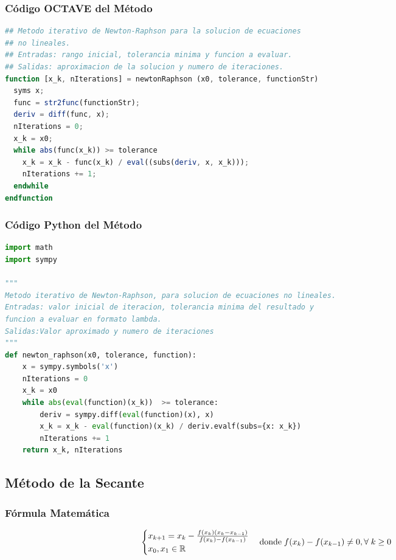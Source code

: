 \documentclass[12pt]{article}
\begin{document}
\subsubsection{Código OCTAVE del Método}
\begin{lstlisting}[language=OCTAVE, caption=Implementación del método de bisección en Octave]
## Metodo iterativo de Newton-Raphson para la solucion de ecuaciones
## no lineales.
## Entradas: rango inicial, tolerancia minima y funcion a evaluar.
## Salidas: aproximacion de la solucion y numero de iteraciones.
function [x_k, nIterations] = newtonRaphson (x0, tolerance, functionStr)
  syms x;
  func = str2func(functionStr);
  deriv = diff(func, x);
  nIterations = 0;
  x_k = x0;
  while abs(func(x_k)) >= tolerance
    x_k = x_k - func(x_k) / eval((subs(deriv, x, x_k)));
    nIterations += 1;
  endwhile
endfunction
\end{lstlisting}

\subsubsection{Código Python del Método}
\begin{lstlisting}[language=Python, caption=Implementación del método de Newton-Raphson en python]
import math
import sympy

"""
Metodo iterativo de Newton-Raphson, para solucion de ecuaciones no lineales.
Entradas: valor inicial de iteracion, tolerancia minima del resultado y 
funcion a evaluar en formato lambda.
Salidas:Valor aproximado y numero de iteraciones
"""
def newton_raphson(x0, tolerance, function):
    x = sympy.symbols('x')
    nIterations = 0
    x_k = x0
    while abs(eval(function)(x_k))  >= tolerance:
        deriv = sympy.diff(eval(function)(x), x)
        x_k = x_k - eval(function)(x_k) / deriv.evalf(subs={x: x_k})
        nIterations += 1
    return x_k, nIterations
    \end{lstlisting}


\subsection{Método de la Secante}

\subsubsection{Fórmula Matemática}
\[\begin{cases} 
      x_{k+1}= x_k -\frac{f(x_k)(x_k-x_{k-1})}{f(x_k)-f(x_{k-1})}\\
      x_0, x_1 \in \mathbb{R}
   \end{cases}\\
   \text{donde}\; f(x_k) - f(x_{k-1}) \neq 0, \forall \;k \geq 0
   \]
\end{document}
